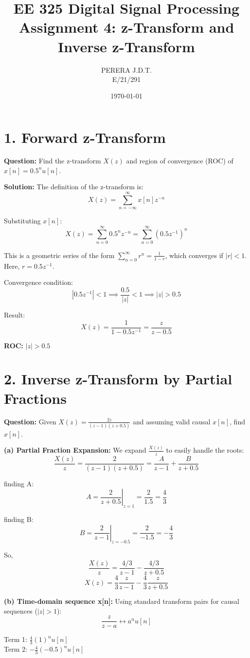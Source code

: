 \documentclass[11pt, a4paper]{article}
\title{EE 325 Digital Signal Processing \\ Assignment 4: z-Transform and Inverse z-Transform}
\author{PERERA J.D.T. \\ E/21/291}
\date{\today}
\begin{document}
\maketitle

\section{1. Forward z-Transform}
\textbf{Question:} Find the z-transform $X(z)$ and region of convergence (ROC) of $x[n] = 0.5^n u[n]$.

\textbf{Solution:}
The definition of the z-transform is:
$$X(z) = \sum_{n=-\infty}^{\infty} x[n] z^{-n}$$

Substituting $x[n]$:
$$X(z) = \sum_{n=0}^{\infty} 0.5^n z^{-n} = \sum_{n=0}^{\infty} (0.5 z^{-1})^n$$

This is a geometric series of the form $\sum_{n=0}^{\infty} r^n = \frac{1}{1-r}$, which converges if $|r| < 1$.
Here, $r = 0.5z^{-1}$.

Convergence condition:
$$|0.5 z^{-1}| < 1 \implies \frac{0.5}{|z|} < 1 \implies |z| > 0.5$$

Result:
$$X(z) = \frac{1}{1 - 0.5z^{-1}} = \frac{z}{z - 0.5}$$

\textbf{ROC:} $|z| > 0.5$

\section{2. Inverse z-Transform by Partial Fractions}
\textbf{Question:} Given $X(z) = \frac{2z}{(z-1)(z+0.5)}$ and assuming valid causal $x[n]$, find $x[n]$.

\textbf{(a) Partial Fraction Expansion:}
We expand $\frac{X(z)}{z}$ to easily handle the roots:
$$\frac{X(z)}{z} = \frac{2}{(z-1)(z+0.5)} = \frac{A}{z-1} + \frac{B}{z+0.5}$$

finding A:
$$A = \left. \frac{2}{z+0.5} \right|_{z=1} = \frac{2}{1.5} = \frac{4}{3}$$

finding B:
$$B = \left. \frac{2}{z-1} \right|_{z=-0.5} = \frac{2}{-1.5} = -\frac{4}{3}$$

So,
$$\frac{X(z)}{z} = \frac{4/3}{z-1} - \frac{4/3}{z+0.5}$$
$$X(z) = \frac{4}{3} \frac{z}{z-1} - \frac{4}{3} \frac{z}{z+0.5}$$

\textbf{(b) Time-domain sequence x[n]:}
Using standard transform pairs for causal sequences ($|z| > 1$):
$$\frac{z}{z-a} \longleftrightarrow a^n u[n]$$

Term 1: $\frac{4}{3} (1)^n u[n]$ \\
Term 2: $-\frac{4}{3} (-0.5)^n u[n]$
\end{document}
